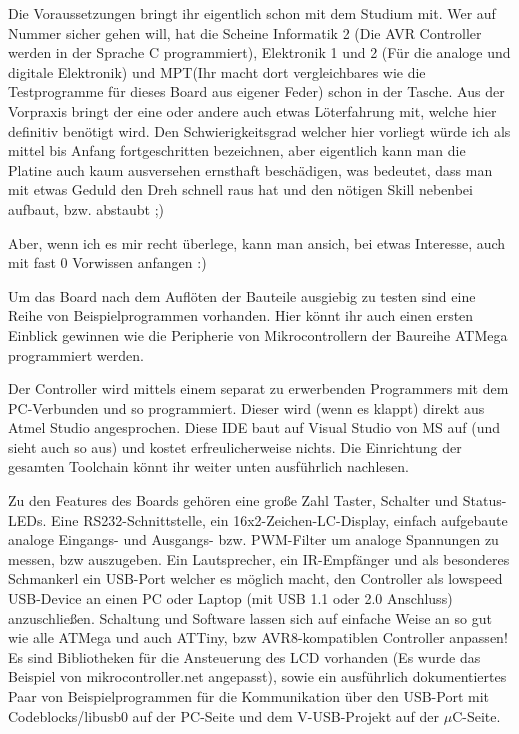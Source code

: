 \documentclass[a4paper]{article}
\begin{document}
Die Voraussetzungen bringt ihr eigentlich schon mit dem Studium mit. Wer auf Nummer sicher gehen will, hat die Scheine Informatik 2 (Die AVR Controller werden in der Sprache C programmiert), Elektronik 1 und 2 (Für die analoge und digitale Elektronik) und MPT(Ihr macht dort vergleichbares wie die Testprogramme für dieses Board aus eigener Feder) schon in der Tasche. Aus der Vorpraxis bringt der eine oder andere auch etwas Löterfahrung mit, welche hier definitiv benötigt wird. Den Schwierigkeitsgrad welcher hier vorliegt würde ich als mittel bis Anfang fortgeschritten bezeichnen, aber eigentlich kann man die Platine auch kaum ausversehen ernsthaft beschädigen, was bedeutet, dass man mit etwas Geduld den Dreh schnell raus hat und den nötigen Skill nebenbei aufbaut, bzw. abstaubt ;)

Aber, wenn ich es mir recht überlege, kann man ansich, bei etwas Interesse, auch mit fast 0 Vorwissen anfangen :)

Um das Board nach dem Auflöten der Bauteile ausgiebig zu testen sind eine Reihe von Beispielprogrammen vorhanden. Hier könnt ihr auch einen ersten Einblick gewinnen wie die Peripherie von Mikrocontrollern der Baureihe ATMega programmiert werden.

Der Controller wird mittels einem separat zu erwerbenden Programmers mit dem PC-Verbunden und so programmiert. Dieser wird (wenn es klappt) direkt aus Atmel Studio angesprochen. Diese IDE baut auf Visual Studio von MS auf (und sieht auch so aus) und kostet erfreulicherweise nichts. Die Einrichtung der gesamten Toolchain könnt ihr weiter unten ausführlich nachlesen.

Zu den Features des Boards gehören eine große Zahl Taster, Schalter und Status-LEDs. Eine RS232-Schnittstelle, ein 16x2-Zeichen-LC-Display, einfach aufgebaute analoge Eingangs- und Ausgangs- bzw. PWM-Filter um analoge Spannungen zu messen, bzw auszugeben. Ein Lautsprecher, ein IR-Empfänger und als besonderes Schmankerl ein USB-Port welcher es möglich macht, den Controller als lowspeed USB-Device an einen PC oder Laptop (mit USB 1.1 oder 2.0 Anschluss) anzuschließen. Schaltung und Software lassen sich auf einfache Weise an so gut wie alle ATMega und auch ATTiny, bzw AVR8-kompatiblen Controller anpassen! Es sind Bibliotheken für die Ansteuerung des LCD vorhanden (Es wurde das Beispiel von mikrocontroller.net angepasst), sowie ein ausführlich dokumentiertes Paar von Beispielprogrammen für die Kommunikation über den USB-Port mit Codeblocks/libusb0 auf der PC-Seite und dem V-USB-Projekt auf der $\mu$C-Seite.
 
\end{document}
